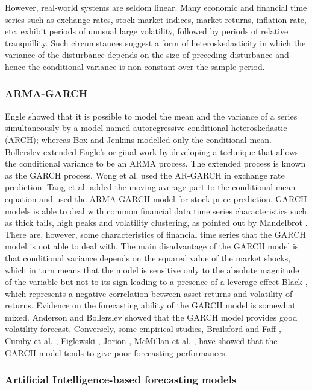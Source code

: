 However, real-world systems are seldom linear. Many economic and financial time series such as exchange rates, stock market indices, market returns, inflation rate, etc. exhibit periods of unusual large volatility, followed by periods of relative tranquillity.
Such circumstances suggest a form of heteroskedasticity in which the variance of the disturbance depends on the size of preceding disturbance and hence the conditional variance is non-constant over the sample period. 

\subsubsection*{ARMA-GARCH}

Engle \cite{Engel} showed that it is possible to model the mean and the variance of a series simultaneously by a model named autoregressive conditional heteroskedastic (ARCH); whereas Box and Jenkins \cite{B&J} modelled only the conditional mean. Bollerslev \cite{Bollerslev} extended Engle’s \cite{Engel} original work by developing a technique that allows the conditional variance to be an ARMA process. The extended process is known as the GARCH process. Wong et al. \cite{Wetal} used the AR-GARCH in exchange rate prediction. Tang et al. \cite{Tetal} added the moving average part to the conditional mean equation and used the ARMA-GARCH model for stock price prediction. GARCH models is able to deal with common financial data time series characteristics such as thick tails, high peaks and volatility clustering, as pointed out by Mandelbrot \cite{Mantelbrot}. There are, however, some characteristics of financial time series that the GARCH model is not able to deal with. The main disadvantage of the GARCH model is that conditional variance depends on the squared value of the market shocks, which in turn means that the model is sensitive only to the absolute magnitude of the variable but not to its sign leading to a presence of a leverage effect Black \cite{Black}, which represents a negative correlation between asset returns and volatility of returns. Evidence on the forecasting ability of the GARCH model is somewhat mixed. Anderson and Bollerslev \cite{A&B} showed that the GARCH model provides good volatility forecast. Conversely, some empirical studies, Brailsford and Faff \cite{f1}, Cumby et al. \cite{f2}, Figlewski \cite{f3},  Jorion \cite{f4}\cite{f5}, McMillan et al. \cite{f6}, have showed that the GARCH model tends to give poor forecasting performances. 

\subsubsection*{Artificial Intelligence-based forecasting models}

